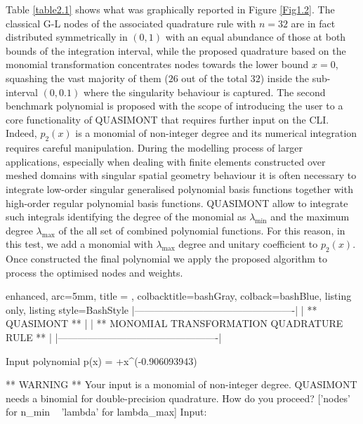\documentclass[a4paper, twosided]{book}
\begin{document}
\noindent
Table \ref{table2.1} shows what was graphically reported in Figure \ref{Fig1.2}. The classical G-L nodes of the associated quadrature rule with $n=32$ are in fact distributed symmetrically in $(0,1)$ with an equal abundance of those at both bounds of the integration interval, while the proposed quadrature based on the monomial transformation  concentrates nodes towards the lower bound $x=0$, squashing the vast majority of them ($26$ out of the total $32$) inside the sub-interval $(0,0.1)$ where the singularity behaviour is captured. The second benchmark polynomial is proposed with the scope of introducing the user to a core functionality of QUASIMONT that requires further input on the CLI. Indeed, $p_2(x)$ is a monomial of non-integer degree and its numerical integration requires careful manipulation. During the modelling process of larger applications, especially when dealing with finite elements constructed over meshed domains with singular spatial geometry behaviour \cite{Graglia04,Graglia08} it is often necessary to integrate low-order singular generalised polynomial basis functions together with high-order regular polynomial basis functions. QUASIMONT allow to integrate such integrals identifying the degree of the monomial as $\lambda_{\text{min}}$ and the maximum degree  $\lambda_{\text{max}}$ of the all set of combined polynomial functions. For this reason, in this test, we add a monomial with $\lambda_{\text{max}}$ degree and unitary coefficient to $p_2(x)$. Once constructed the final polynomial we apply the proposed algorithm to process the optimised nodes and weights. 

\vspace{0.15cm}
\begin{tcblisting}{enhanced,
                   arc=5mm,
                   title = \color{black}{\large \ttfamily Building and executing the test driver: p\_2(x)},
                   colbacktitle=bashGray,
                   colback=bashBlue,
                   listing only,
                   listing style=BashStyle}
    |-------------------------------------------------|
    |                 ** QUASIMONT **                 |
    |  ** MONOMIAL TRANSFORMATION QUADRATURE RULE **  |
    |-------------------------------------------------|

 Input polynomial p(x) =  +x^(-0.906093943) 

 ** WARNING ** Your input is a monomial of non-integer degree.
               QUASIMONT needs a binomial for double-precision quadrature.
               How do you proceed? ['nodes' for n_min ~ 'lambda' for lambda_max]
               Input: 
\end{tcblisting}
\end{document}
